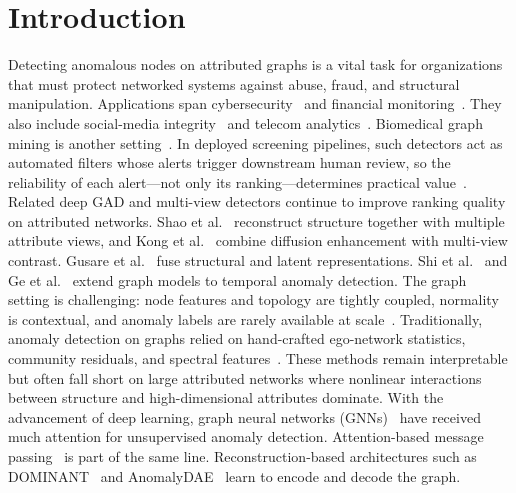 \documentclass[a4paper]{cas-dc}
\theoremstyle{definition}
\begin{document}
\maketitle

\section{Introduction}
\label{sec:introduction}

Detecting anomalous nodes on attributed graphs is a vital task for organizations that must protect networked systems against abuse, fraud, and structural manipulation.
Applications span cybersecurity~\cite{ding2019dominant} and financial monitoring~\cite{xu2022conad}.
They also include social-media integrity~\cite{fan2020anomalydae} and telecom analytics~\cite{ma2021comprehensive}.
Biomedical graph mining is another setting~\cite{akoglu2015graph}.
In deployed screening pipelines, such detectors act as automated filters whose alerts trigger downstream human review, so the reliability of each alert---not only its ranking---determines practical value~\cite{ma2021comprehensive,bates2023testing}.
Related deep GAD and multi-view detectors continue to improve ranking quality on attributed networks.
Shao et al.~\cite{shao2023kbsgdae} reconstruct structure together with multiple attribute views, and Kong et al.~\cite{kong2025kbsdegad} combine diffusion enhancement with multi-view contrast.
Gusare et al.~\cite{gusare2026kbsmaf} fuse structural and latent representations.
Shi et al.~\cite{shi2023kbsmutant} and Ge et al.~\cite{ge2024kbsestcn} extend graph models to temporal anomaly detection.
The graph setting is challenging: node features and topology are tightly coupled, normality is contextual, and anomaly labels are rarely available at scale~\cite{ma2021comprehensive}.
Traditionally, anomaly detection on graphs relied on hand-crafted ego-network statistics, community residuals, and spectral features~\cite{akoglu2015graph,sen2008collective}.
These methods remain interpretable but often fall short on large attributed networks where nonlinear interactions between structure and high-dimensional attributes dominate.
With the advancement of deep learning, graph neural networks (GNNs)~\cite{kipf2017gcn,hamilton2017inductive} have received much attention for unsupervised anomaly detection.
Attention-based message passing~\cite{velickovic2018graph} is part of the same line.
Reconstruction-based architectures such as DOMINANT~\cite{ding2019dominant} and AnomalyDAE~\cite{fan2020anomalydae} learn to encode and decode the graph.
\end{document}
